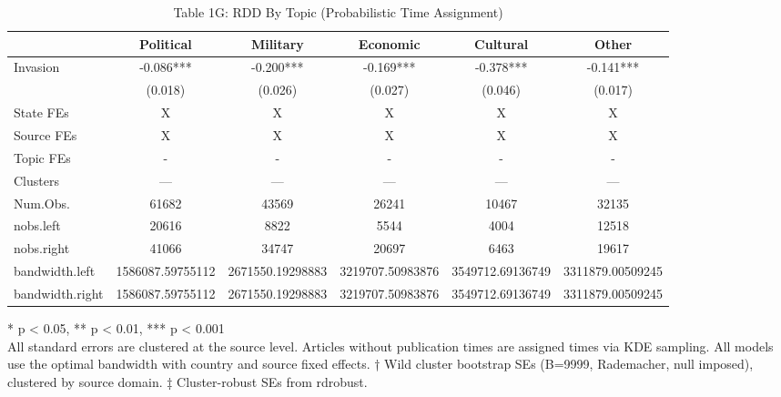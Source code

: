 \begin{table}[!t]
\caption{Table 1G: RDD By Topic (Probabilistic Time Assignment)} 
\fontsize{12.0pt}{14.4pt}\selectfont
\begin{tabular*}{\linewidth}{@{\extracolsep{\fill}}lccccc}
\toprule
  & Political & Military & Economic & Cultural & Other \\ 
\midrule\addlinespace[2.5pt]
Invasion & -0.086*** & -0.200*** & -0.169*** & -0.378*** & -0.141*** \\ 
{} & {(0.018)} & {(0.026)} & {(0.027)} & {(0.046)} & {(0.017)} \\ 
State FEs & X & X & X & X & X \\ 
Source FEs & X & X & X & X & X \\ 
Topic FEs & - & - & - & - & - \\ 
Clusters & — & — & — & — & — \\ 
Num.Obs. & 61682 & 43569 & 26241 & 10467 & 32135 \\ 
nobs.left & 20616 & 8822 & 5544 & 4004 & 12518 \\ 
nobs.right & 41066 & 34747 & 20697 & 6463 & 19617 \\ 
bandwidth.left & 1586087.59755112 & 2671550.19298883 & 3219707.50983876 & 3549712.69136749 & 3311879.00509245 \\ 
bandwidth.right & 1586087.59755112 & 2671550.19298883 & 3219707.50983876 & 3549712.69136749 & 3311879.00509245 \\ 
\bottomrule
\end{tabular*}
\begin{minipage}{\linewidth}
* p < 0.05, ** p < 0.01, *** p < 0.001\\
All standard errors are clustered at the source level. Articles without
publication times are assigned times via KDE sampling. All models use the
optimal bandwidth with country and source fixed effects. † Wild cluster
bootstrap SEs (B=9999, Rademacher, null imposed), clustered by source domain. ‡
Cluster-robust SEs from rdrobust.\\
\end{minipage}
\end{table}

